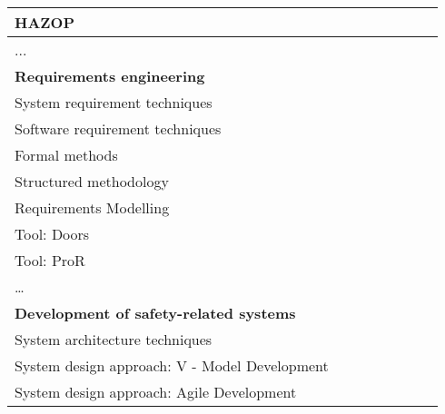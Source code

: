 \documentclass[a4paper, 11pt]{article}
\begin{document}
\begin{center}
\begin{longtable}{|r|r|r|r|r|r|r|r|}
    \hline
    \multicolumn{1}{|l|}{HAZOP} & \multicolumn{1}{c|}{} &       &       &       &       &       &  \bigstrut\\
    \hline
    \multicolumn{1}{|l|}{...} & \multicolumn{1}{c|}{} &       &       &       &       &       &  \bigstrut[t]\\
    \multicolumn{1}{|l|}{\textbf{Requirements engineering}} & \multicolumn{1}{l|}{\textbf{}} &       &       &       &       &       &  \\
    \multicolumn{1}{|l|}{System requirement techniques} & \multicolumn{1}{l|}{} &       &       &       &       &       &  \bigstrut[b]\\
    \hline
    \multicolumn{1}{|l|}{Software requirement techniques} & \multicolumn{1}{l|}{} &       &       &       &       &       &  \bigstrut\\
    \hline
    \multicolumn{1}{|l|}{Formal methods} & \multicolumn{1}{l|}{} &       &       &       &       &       &  \bigstrut\\
    \hline
    \multicolumn{1}{|l|}{Structured methodology} & \multicolumn{1}{l|}{} &       &       &       &       &       &  \bigstrut\\
    \hline
    \multicolumn{1}{|l|}{Requirements Modelling} & \multicolumn{1}{l|}{} &       &       &       &       &       &  \bigstrut\\
    \hline
    \multicolumn{1}{|l|}{Tool: Doors } & \multicolumn{1}{l|}{} &       &       &       &       &       &  \bigstrut\\
    \hline
    \multicolumn{1}{|l|}{Tool: ProR} & \multicolumn{1}{l|}{} &       &       &       &       &       &  \bigstrut\\
    \hline
    \multicolumn{1}{|l|}{…} & \multicolumn{1}{l|}{} &       &       &       &       &       &  \bigstrut[t]\\
    \multicolumn{1}{|l|}{\textbf{Development of safety-related systems}} & \multicolumn{1}{c|}{\textbf{}} &       &       &       &       &       &  \\
    \multicolumn{1}{|l|}{System architecture techniques} & \multicolumn{1}{c|}{} &       &       &       &       &       &  \bigstrut[b]\\
    \hline
    \multicolumn{1}{|l|}{System design approach: V - Model Development} & \multicolumn{1}{c|}{} &       &       &       &       &       &  \bigstrut\\
    \hline
    \multicolumn{1}{|l|}{System design approach: Agile Development} & \multicolumn{1}{c|}{} &       &       &       &       &       &  \bigstrut\\

\end{longtable}
\end{center}
\end{document}
